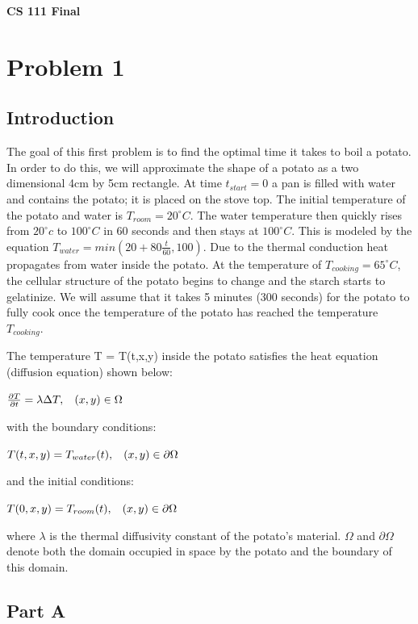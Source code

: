\documentclass[12pt]{article}
\begin{document}
\centerline{\Large\textbf{CS 111 Final}}
\vspace{.5cm}

\section*{Problem 1}\label{sec::Problem1}
\subsection*{Introduction}
The goal of this first problem is to find the optimal time it takes to boil a potato. In order to do this, we will approximate the shape of a potato as a two dimensional 4cm by 5cm rectangle. At time $t_{start}=0$ a pan is filled with water and contains the potato; it is placed on the stove top. The initial temperature of the potato and water is $T_{room} = 20^\circ C$. The water temperature then quickly rises from $20^\circ c$ to $100^\circ C$ in 60 seconds and then stays at $100^\circ C$. This is modeled by the equation $T_{water} = min(20 + 80\frac{t}{60}, 100)$. Due to the thermal conduction heat propagates from water inside the potato. At the temperature of $T_{cooking} = 65^\circ C$, the cellular structure of the potato begins to change and the starch starts to gelatinize. We will assume that it takes 5 minutes (300 seconds) for the potato to fully cook once the temperature of the potato has reached the temperature $T_{cooking}$.

The temperature T = T(t,x,y) inside the potato satisfies the heat equation (diffusion equation) shown below:
\begin{center}
$\frac{\partial T}{\partial t}= \lambda \Delta T ,\hspace{.3cm}(x,y) \in \Omega$
\end{center}
with the boundary conditions:
\begin{center}
$T(t,x,y) = T_{water}(t),\hspace{.3cm}(x,y) \in \partial \Omega$
\end{center}
and the initial conditions:
\begin{center}
$T(0,x,y) = T_{room}(t),\hspace{.3cm}(x,y) \in \partial \Omega$
\end{center}
where $\lambda$ is the thermal diffusivity constant of the potato's material. $\Omega$ and $\partial \Omega$ denote both the domain occupied in space by the potato and the boundary of this domain.

\subsection*{Part A}
\end{document}
